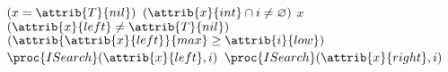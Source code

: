 \begin{codebox}
\li \If $(x = \attrib{T}{nil})$ \Or $(\attrib{x}{int} \cap i \neq \varnothing)$
\li \Then 
        \Return $x$
\li \ElseIf $(\attrib{x}{left} \neq \attrib{T}{nil})$ \And $(\attrib{\attrib{x}{left}}{max} \geq \attrib{i}{low})$
\li  \Then
		\Return $\proc{ISearch}(\attrib{x}{left},i)$
\li \ElseNoIf 
\li	     \Return $\proc{ISearch}(\attrib{x}{right},i)$
    \End
\end{codebox}